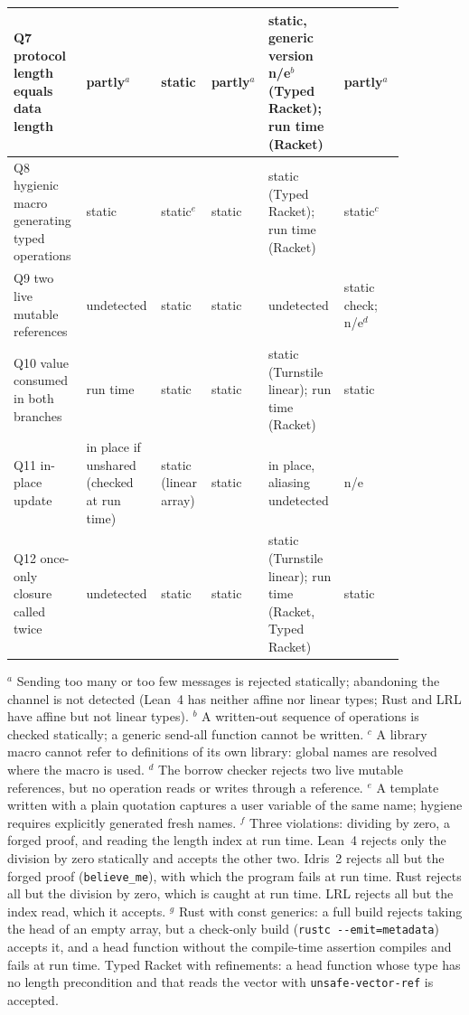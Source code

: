 \begin{table}[t]
\begin{tabular}{p{0.16\linewidth}p{0.11\linewidth}p{0.11\linewidth}p{0.14\linewidth}p{0.18\linewidth}p{0.155\linewidth}}
Q7 protocol length equals data length & partly$^a$ & static & partly$^a$ & static, generic version n/e$^b$ (Typed Racket); run time (Racket) & partly$^a$\\\hline
Q8 hygienic macro generating typed operations & static & static$^e$ & static & static (Typed Racket); run time (Racket) & static$^c$\\\hline
Q9 two live mutable references & undetected & static & static & undetected & static check; n/e$^d$\\\hline
Q10 value consumed in both branches & run time & static & static & static (Turnstile linear); run time (Racket) & static\\\hline
Q11 in-place update & in place if unshared (checked at run time) & static (linear array) & static & in place, aliasing undetected & n/e\\\hline
Q12 once-only closure called twice & undetected & static & static & static (Turnstile linear); run time (Racket, Typed Racket) & static\\\hline
\end{tabular}

\smallskip
\begin{minipage}{0.95\linewidth}\scriptsize
$^a$ Sending too many or too few messages is rejected statically; abandoning the channel is not detected (Lean~4 has neither affine nor linear types; Rust and LRL have affine but not linear types).
$^b$ A written-out sequence of operations is checked statically; a generic send-all function cannot be written.
$^c$ A library macro cannot refer to definitions of its own library: global names are resolved where the macro is used.
$^d$ The borrow checker rejects two live mutable references, but no operation reads or writes through a reference.
$^e$ A template written with a plain quotation captures a user variable of the same name; hygiene requires explicitly generated fresh names.
$^f$ Three violations: dividing by zero, a forged proof, and reading the length index at run time. Lean~4 rejects only the division by zero statically and accepts the other two. Idris~2 rejects all but the forged proof (\lstinline|believe_me|), with which the program fails at run time. Rust rejects all but the division by zero, which is caught at run time. LRL rejects all but the index read, which it accepts.
$^g$ Rust with const generics: a full build rejects taking the head of an empty array, but a check-only build (\texttt{rustc -{}-emit=metadata}) accepts it, and a head function without the compile-time assertion compiles and fails at run time. Typed Racket with refinements: a head function whose type has no length precondition and that reads the vector with \lstinline|unsafe-vector-ref| is accepted.
\end{minipage}
\end{table}

